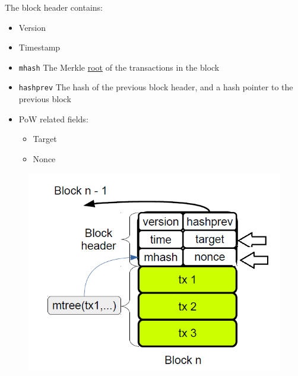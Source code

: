 \begin{paracol}{2}
   \ns
   The block header contains:
   \begin{itemize}
      \item Version
      \item Timestamp
      \item \texttt{mhash} The Merkle \ul{root} of the transactions in the block
      \item \texttt{hashprev} The hash of the previous block header, and a hash pointer to the previous block
      \item PoW related fields:
      \begin{itemize}
         \item Target
         \item Nonce
      \end{itemize}
   \end{itemize}
   \switchcolumn

   \colfill
   \begin{figure}[htbp]
      \centering
      \includegraphics{images/bitcoin_blockheader.png}
      \label{fig:bitcoin_blockheader}
   \end{figure}
   \colfill

\end{paracol}

